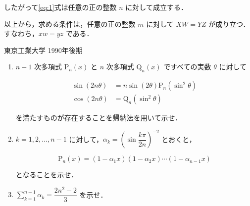 \documentclass[a4paper]{ltjsarticle}
\begin{document}
したがって\eqref{eq:1}式は任意の正の整数 $n$ に対して成立する．

以上から，求める条件は，任意の正の整数 $m$ に対して $XW=YZ$ が成り立つ．すなわち，$xw=yz$ である．


\begin{itembox}[l]{東京工業大学 1990年後期}
    \begin{enumerate}[label=(\arabic*)]
        \item $n-1$ 次多項式 $\mathrm{P}_n(x)$ と $n$ 次多項式 $\mathrm{Q}_n(x)$ ですべての実数 $\theta$ に対して

              \begin{align*}
                  \sin(2n\theta) & =n\sin(2\theta)\mathrm{P}_n(\sin^2\theta) \\
                  \cos(2n\theta) & =\mathrm{Q}_n(\sin^2\theta)
              \end{align*}

              を満たすものが存在することを帰納法を用いて示せ．

        \item $k=1, 2, \ldots, n-1$ に対して，$\alpha_k=\left(\sin\dfrac{k\pi}{2n}\right)^{-2}$ とおくと，

              \begin{equation*}
                  \mathrm{P}_n(x)=(1-{\alpha_1}x)(1-{\alpha_2}x)\cdots(1-{\alpha_{n-1}}x)
              \end{equation*}

              となることを示せ．

        \item $\displaystyle\sum_{k=1}^{n-1}\alpha_k=\dfrac{2n^2-2}{3}$ を示せ．
    \end{enumerate}
\end{itembox}
\end{document}
